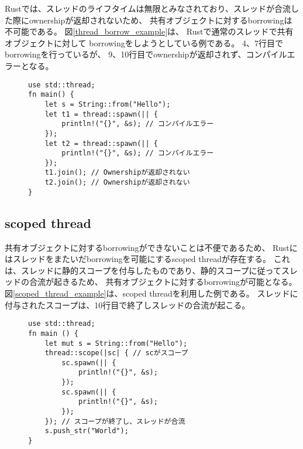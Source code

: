 \documentclass{sumiilab-paper}
\theoremstyle{mystyle}
\numberwithin{definition}{chapter} %
\begin{document}
Rustでは、スレッドのライフタイムは無限とみなされており、スレッドが合流した際にownershipが返却されないため、
共有オブジェクトに対するborrowingは不可能である。
図\ref{thread_borrow_example}は、
Rustで通常のスレッドで共有オブジェクトに対して
borrowingをしようとしている例である。
4、7行目でborrowingを行っているが、
9、10行目でownershipが返却されず、コンパイルエラーとなる。
\begin{figure}[htp]
\begin{lstlisting}[caption=通常のスレッドでborrowingができない例, 
  label=thread_borrow_example, captionpos=b]
use std::thread;
fn main() {
    let s = String::from("Hello");
    let t1 = thread::spawn(|| {
        println!("{}", &s); // コンパイルエラー
    });
    let t2 = thread::spawn(|| {
        println!("{}", &s); // コンパイルエラー
    });
    t1.join(); // Ownershipが返却されない
    t2.join(); // Ownershipが返却されない
}
\end{lstlisting}
\end{figure}

\subsection{scoped thread}
共有オブジェクトに対するborrowingができないことは不便であるため、
Rustにはスレッドをまたいだborrowingを可能にするscoped threadが存在する。
これは、スレッドに静的スコープを付与したものであり、静的スコープに従ってスレッドの合流が起きるため、
共有オブジェクトに対するborrowingが可能となる。
図\ref{scoped_thread_example}は、scoped threadを利用した例である。
スレッドに付与されたスコープは、10行目で終了しスレッドの合流が起こる。
\begin{figure}[htp]
\begin{lstlisting}[caption=Scoped threadの例, label=scoped_thread_example, captionpos=b]
use std::thread;
fn main () {
    let mut s = String::from("Hello");
    thread::scope(|sc| { // scがスコープ
        sc.spawn(|| {
            println!("{}", &s);
        });
        sc.spawn(|| {
            println!("{}", &s);
        });
    }); // スコープが終了し、スレッドが合流
    s.push_str("World");
}
\end{lstlisting}
\end{figure}
\end{document}
